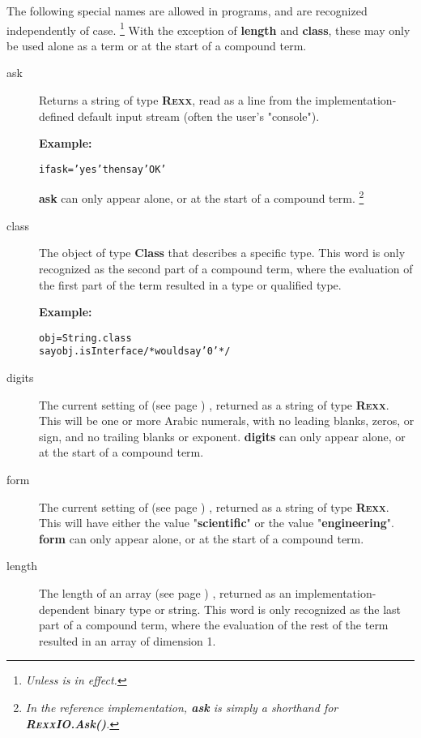 The following special names are allowed in \nr{} programs, and are
recognized independently of case.
\footnote{
\emph{Unless  is in effect.
}
}
With the exception of \textbf{length} and \textbf{class}, these
may only be used alone as a term or at the start of a compound term.
\begin{description}
\item[ask]\label{refswask}
 
Returns a string of type \textbf{R\textsc{exx}}, read as a line from the
implementation-defined default input stream (often the user's
"console").

\textbf{Example:}
\begin{alltt}
if ask='yes' then say 'OK'
\end{alltt}
 \textbf{ask} can only appear alone, or at the start of a
compound term.
\footnote{
\emph{In the reference implementation, \textbf{ask} is simply a shorthand
for \textbf{R\textsc{exx}IO.Ask()}.}
}
\item[class]\label{refswclass}
 
The object of type \textbf{Class} that describes a specific type.
This word is only recognized as the second part of a compound term,
where the evaluation of the first part of the term resulted in a
type or qualified type.

\textbf{Example:}
\begin{alltt}
obj=String.class
say obj.isInterface /* would say '0' */
\end{alltt}
\item[digits]\label{refswdigit}
 The current setting of   (see page \pageref{refndigits}) ,
returned as a string of type \textbf{R\textsc{exx}}.
This will be one or more Arabic numerals, with no leading blanks, zeros,
or sign, and no trailing blanks or exponent.
 \textbf{digits} can only appear alone, or at the start of a
compound term.
\item[form]\label{refswform}
 The current setting of   (see page \pageref{refnform}) ,
returned as a string of type \textbf{R\textsc{exx}}.
This will have either the value "\textbf{scientific}" or the
value "\textbf{engineering}".
 \textbf{form} can only appear alone, or at the start of a
compound term.
\item[length]\label{refswleng}
 The length of an  array (see page \pageref{refarray}) , returned as an
implementation-dependent binary type or string.
This word is only recognized as the last part of a compound term,
where the evaluation of the rest of the term resulted in an array of
dimension 1.
 

\end{description}
